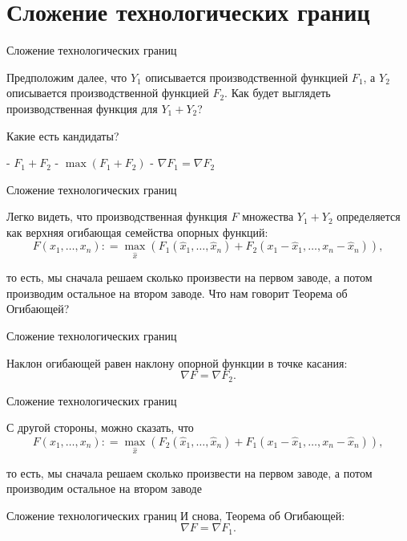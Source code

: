 \documentclass{beamer}
\begin{document}
\section{Сложение технологических границ}

\begin{frame}{Сложение технологических границ}

Предположим далее, что $Y_1$ описывается производственной функцией $F_1$, а $Y_2$ описывается производственной функцией $F_2$. Как будет выглядеть производственная функция для $Y_1 + Y_2$?

Какие есть кандидаты?

- $F_1 + F_2$
- $\max(F_1 + F_2)$
- $\nabla F_1 = \nabla F_2$

\end{frame}

\begin{frame}{Сложение технологических границ}

Легко видеть, что производственная функция $F$ множества $Y_1 + Y_2$ определяется как верхняя огибающая семейства опорных функций: $$F(x_1, \ldots, x_n) : = \max_{\hat x} \left(F_1(\hat x_1, \ldots, \hat x_n) + F_2(x_1 - \hat x_1, \ldots, x_n - \hat x_n)\right),$$

то есть, мы сначала решаем сколько произвести на первом заводе, а потом производим остальное на втором заводе. Что нам говорит Теорема об Огибающей?

\end{frame}

\begin{frame}{Сложение технологических границ}

Наклон огибающей равен наклону опорной функции в точке касания:
$$ \nabla F = \nabla F_2.$$

\end{frame}

\begin{frame}{Сложение технологических границ}

С другой стороны, можно сказать, что
$$F(x_1, \ldots, x_n) : = \max_{\hat x} \left(F_2(\hat x_1, \ldots, \hat x_n) + F_1(x_1 - \hat x_1, \ldots, x_n - \hat x_n)\right),$$

то есть, мы сначала решаем сколько произвести на первом заводе, а потом производим остальное на втором заводе

\end{frame}

\begin{frame}{Сложение технологических границ}
И снова, Теорема об Огибающей:
$$ \nabla F = \nabla F_1.$$

\end{frame}
\end{document}
